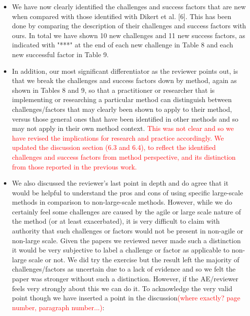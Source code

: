 \documentclass[a4paper,twoside,11pt]{reviewresponse}
\begin{document}
\begin{itemize}
	\item We have now clearly identified the challenges and success factors that are new when compared with those identified with Dikert et al. [6]. This has been done by comparing the description of their challenges and success factors with ours. In total we have shown 10 new challenges and 11 new success factors, as indicated with "***" at the end of each new challenge in Table 8 and each new successful factor in Table 9.
	\item In addition, our most significant differentiator as the reviewer points out, is that we break the challenges and success factors down by method, again as shown in Tables 8 and 9, so that a practitioner or researcher that is implementing or researching a particular method can distinguish between challenges/factors that may clearly been shown to apply to their method, versus those general ones that have been identified in other methods and so may not apply in their own method context. \textcolor{red}{This was not clear and so we have revised the implications for research and practice accordingly. We updated the discussion section (6.3 and 6.4), to reflect the identified challenges and success factors from method perspective, and its distinction from those reported in the previous work.}
	\item We also discussed the reviewer's last point in depth and do agree that it would be helpful to understand the pros and cons of using specific large-scale methods in comparison to non-large-scale methods. However, while we do certainly feel some challenges are caused by the agile or large scale nature of the method (or at least exacerbated), it is very difficult to claim with authority that such challenges or factors would not be present in non-agile or non-large scale. Given the papers we reviewed never made such a distinction it would be very subjective to label a challenge or factor as applicable to non-large scale or not. We did try the exercise but the result left the majority of challenges/factors as uncertain due to a lack of evidence and so we felt the paper was stronger without such a distinction. However, if the AE/reviewer feels very strongly about this we can do it. To acknowledge the very valid point though we have inserted a point in the discussion\textcolor{red}{(where exactly? page number, paragraph number...)}:\\


\end{itemize}
\end{document}
